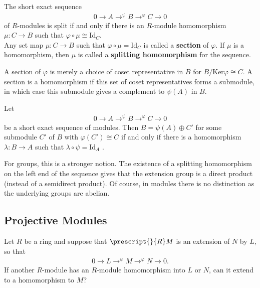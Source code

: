 \documentclass{memoir}
\begin{document}
\begin{prop}
	The short exact sequence
	\begin{align*}
		0 \to A \to^{\psi }B \to^{\varphi }C \to 0
	\end{align*}
	of \(R\)-modules is split if and only if there is an \(R\)-module homomorphism \(\mu :C \to B\) such that \(\varphi \circ \mu \cong \textrm{Id}_C\).\\

	Any set map \(\mu :C\to B\) such that \(\varphi \circ \mu = \textrm{Id}_C\) is called a \textbf{section} of \(\varphi \). If \(\mu \) is a homomorphism, then \(\mu \) is called a \textbf{splitting homomorphism} for the sequence.
\end{prop}
A section of \(\varphi \) is merely a choice of coset representative in \(B\) for \(B / \textrm{Ker}\varphi  \cong C\). A section is a homomorphism if this set of coset representatives forms a submodule, in which case this submodule gives a complement to \(\psi (A)\) in \(B\).

\begin{exmp}
	
\end{exmp}

\begin{prop}
	Let
	\begin{align*}
		0 \to A \to^{\psi }B \to^{\varphi }C \to 0
	\end{align*}
	be a short exact sequence of modules. Then \(B = \psi (A) \oplus C'\) for some submodule \(C'\) of \(B\) with \(\varphi (C') \cong C\) if and only if there is a homomorphism \(\lambda :B\to A\) such that \(\lambda \circ \psi = \textrm{Id}_A\) .
\end{prop}
For groups, this is a stronger notion. The existence of a splitting homomorphism on the left end of the sequence gives that the extension group is a direct product (instead of a semidirect product). Of course, in modules there is no distinction as the underlying groups are abelian.

\subsection{Projective Modules}
\label{sub:projective_modules}

Let \(R\) be a ring and suppose that \(\prescript{}{R}M\) is an extension of \(N\) by \(L\), so that
\begin{align*}
	0 \to L \to^{\psi }M \to^{\varphi }N \to 0.
\end{align*}
If another \(R\)-module has an \(R\)-module homomorphism into \(L\) or \(N\), can it extend to a homomorphism to \(M\)?\\
\end{document}
